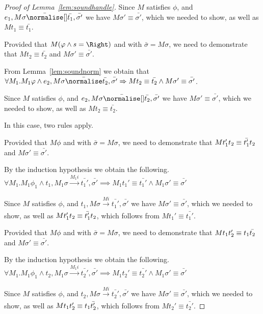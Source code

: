 \begin{proof}[Proof of Lemma~\ref{lem:soundhandle}]
{{    Since $M$ satisfies $\phi$, and $e_1,M\sigma \bar{\normalise}[] \bar{t_1},\bar{\sigma'}$ we have $M\sigma'\equiv\bar{\sigma'}$,
    which we needed to show, as well as $M t_1 \equiv \bar{t_1}$.

    }
    {Provided that $M(\phi\wedge s=\Right)$ and  with $\bar{\sigma}=M\sigma$,
    we need to demonstrate that $M t_2\equiv \bar{t_2}$ and $M\sigma'\equiv \bar{\sigma'}$.

    From Lemma~\ref{lem:soundnorm} we obtain that $\forall M_1. M_1 \phi \land e_2,M\sigma\bar{\normalise}\bar{t_2},\bar{\sigma'}\implies M t_2\equiv\bar{t_2}\land M \sigma'\equiv\bar{\sigma'}$.

    Since $M$ satisfies $\phi$, and $e_2,M\sigma \bar{\normalise}[] \bar{t_2},\bar{\sigma'}$ we have $M\sigma'\equiv\bar{\sigma'}$,
    which we needed to show, as well as $M t_2 \equiv \bar{t_2}$.
    }
  }

  {
  In this case, two rules apply.\\
    {Provided that $M\phi$ and  with $\bar{\sigma}=M\sigma$,
    we need to demonstrate that $M t_1'\relax t_2\equiv \bar{t_1'}\relax t_2$ and $M\sigma'\equiv \bar{\sigma'}$.

    By the induction hypothesis we obtain the following.\\
    $\forall M_1 . M_1 \phi_1 \land t_1,M_1\sigma \xrightarrow[]{M_1 i} \bar{t_1'},\bar{\sigma'}\implies M_1 t_1'\equiv\bar{t_1'}\land M_1\sigma' \equiv \bar{\sigma'}$

    Since $M$ satisfies $\phi$, and $t_1,M\sigma\xrightarrow[]{M i} \bar{t_1'},\bar{\sigma'}$ we have $M\sigma'\equiv\bar{\sigma'}$,
    which we needed to show, as well as $M t_1'\relax t_2\equiv \bar{t_1'}\relax t_2$, which follows from $M t_1' \equiv \bar{t_1'}$.

    }
    {Provided that $M\phi$ and  with $\bar{\sigma}=M\sigma$,
    we need to demonstrate that $M t_1\relax t_2'\equiv t_1\relax \bar{t_2}$ and $M\sigma'\equiv \bar{\sigma'}$.

    By the induction hypothesis we obtain the following.\\
    $\forall M_1 . M_1 \phi_1 \land t_2,M_1\sigma \xrightarrow[]{M_1 i} \bar{t_2'},\bar{\sigma'}\implies M_1 t_2'\equiv\bar{t_2'}\land M_1\sigma' \equiv \bar{\sigma'}$

    Since $M$ satisfies $\phi$, and $t_2,M\sigma\xrightarrow[]{M i} \bar{t_2'},\bar{\sigma'}$ we have $M\sigma'\equiv\bar{\sigma'}$,
    which we needed to show, as well as $M t_1\relax t_2'\equiv t_1\relax \bar{t_2'}$, which follows from $M t_2' \equiv \bar{t_2'}$.}
  }


\end{proof}
